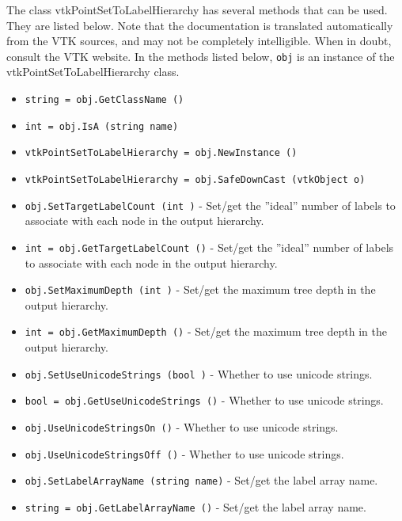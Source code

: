 The class vtkPointSetToLabelHierarchy has several methods that can be used.
  They are listed below.
Note that the documentation is translated automatically from the VTK sources,
and may not be completely intelligible.  When in doubt, consult the VTK website.
In the methods listed below, \verb|obj| is an instance of the vtkPointSetToLabelHierarchy class.
\begin{itemize}
\item  \verb|string = obj.GetClassName ()|

\item  \verb|int = obj.IsA (string name)|

\item  \verb|vtkPointSetToLabelHierarchy = obj.NewInstance ()|

\item  \verb|vtkPointSetToLabelHierarchy = obj.SafeDownCast (vtkObject o)|

\item  \verb|obj.SetTargetLabelCount (int )| -  Set/get the ''ideal'' number of labels to associate with each node in the output hierarchy.

\item  \verb|int = obj.GetTargetLabelCount ()| -  Set/get the ''ideal'' number of labels to associate with each node in the output hierarchy.

\item  \verb|obj.SetMaximumDepth (int )| -  Set/get the maximum tree depth in the output hierarchy.

\item  \verb|int = obj.GetMaximumDepth ()| -  Set/get the maximum tree depth in the output hierarchy.

\item  \verb|obj.SetUseUnicodeStrings (bool )| -  Whether to use unicode strings.

\item  \verb|bool = obj.GetUseUnicodeStrings ()| -  Whether to use unicode strings.

\item  \verb|obj.UseUnicodeStringsOn ()| -  Whether to use unicode strings.

\item  \verb|obj.UseUnicodeStringsOff ()| -  Whether to use unicode strings.

\item  \verb|obj.SetLabelArrayName (string name)| -  Set/get the label array name.

\item  \verb|string = obj.GetLabelArrayName ()| -  Set/get the label array name.


\end{itemize}
